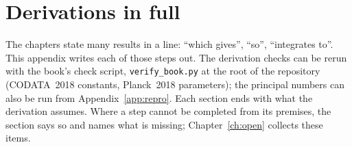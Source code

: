 \chapter{Derivations in full}\label{app:derivations}

The chapters state many results in a line: ``which gives'', ``so'', ``integrates to''. This appendix writes each of those steps out.
The derivation checks can be rerun with the book's check script, \texttt{verify\_book.py} at the root of the repository (CODATA~2018 constants,
Planck~2018 parameters); the principal numbers can also be run from Appendix~\ref{app:repro}. Each section ends with what the derivation assumes. Where a step cannot be completed
from its premises, the section says so and names what is missing; Chapter~\ref{ch:open} collects these items.

